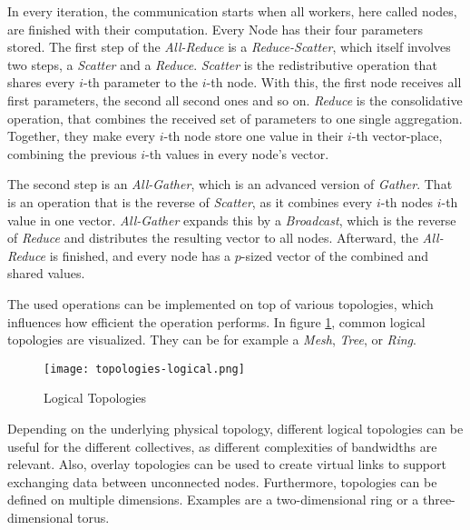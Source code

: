 In every iteration, the communication starts when all workers, here called nodes, are finished with their computation. Every Node has their four parameters stored.
The first step of the \textit{All-Reduce} is a \textit{Reduce-Scatter}, which itself involves two steps, a \textit{Scatter} and a \textit{Reduce}. \textit{Scatter} is the redistributive operation that shares every $i$-th parameter to the $i$-th node. With this, the first node receives all first parameters, the second all second ones and so on. 
\textit{Reduce} is the consolidative operation, that combines the received set of parameters to one single aggregation.
Together, they make every $i$-th node store one value in their $i$-th vector-place, combining the previous $i$-th values in every node's vector.

The second step is an \textit{All-Gather}, which is an advanced version of \textit{Gather}. That is an operation that is the reverse of \textit{Scatter}, as it combines every $i$-th nodes $i$-th value in one vector. \textit{All-Gather} expands this by a \textit{Broadcast}, which is the reverse of \textit{Reduce} and distributes the resulting vector to all nodes.
Afterward, the \textit{All-Reduce} is finished, and every node has a $p$-sized vector of the combined and shared values.

The used operations can be implemented  on top of various topologies, which influences how efficient the operation performs. In figure \ref{fig:topologies-logical}, common logical topologies are visualized. They can be for example a \textit{Mesh}, \textit{Tree}, or \textit{Ring}.

\begin{figure}[H]  %
  \centering
  \texttt{[image: topologies-logical.png]}
  \caption{Logical Topologies}
  \label{fig:topologies-logical}
\end{figure}

Depending on the underlying physical topology, different logical topologies can be useful for the different collectives, as different complexities of bandwidths are relevant. Also, overlay topologies can be used to create virtual links to support exchanging data between unconnected nodes. %
Furthermore, topologies can be defined on multiple dimensions. Examples are a two-dimensional ring or a three-dimensional torus.




